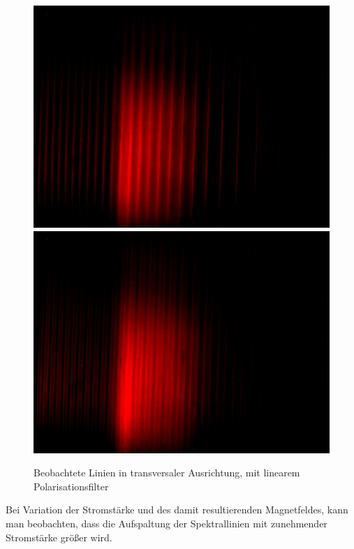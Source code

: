       \begin{figure}[H]
        \centering
        \includegraphics[width=.6\paperwidth, trim={0 300pt 0 900pt}, clip]{Auswertung/data/trans/10A/10A_pi}
        \includegraphics[width=.6\paperwidth, trim={0 300pt 0 900pt}, clip]{Auswertung/data/trans/10A/10A_sig}
        \caption{Beobachtete Linien in transversaler Ausrichtung, mit linearem Polarisationsfilter}
        \label{pic::3}
      \end{figure}

      Bei Variation der Stromstärke und des damit resultierenden Magnetfeldes, kann man beobachten, dass die Aufspaltung der Spektrallinien mit zunehmender Stromstärke größer wird.

